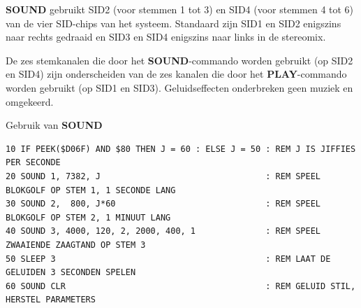 \begin{description}[leftmargin=2cm,style=nextline]
                  {\bf SOUND} gebruikt SID2 (voor stemmen 1 tot 3) en SID4 (voor stemmen 4 tot 6) van de vier SID-chips van het systeem. Standaard zijn SID1 en SID2 enigszins naar rechts gedraaid en SID3 en SID4 enigszins naar links in de stereomix.

                  De zes stemkanalen die door het {\bf SOUND}-commando worden gebruikt (op SID2 en SID4) zijn onderscheiden van de zes kanalen die door het {\bf PLAY}-commando worden gebruikt (op SID1 en SID3). Geluidseffecten onderbreken geen muziek en omgekeerd.

\item [Voorbeeld:]  Gebruik van {\bf SOUND}

\begin{tcolorbox}[colback=black,coltext=white]
\verbatimfont{\codefont}
\begin{verbatim}
10 IF PEEK($D06F) AND $80 THEN J = 60 : ELSE J = 50 : REM J IS JIFFIES PER SECONDE
20 SOUND 1, 7382, J                                 : REM SPEEL BLOKGOLF OP STEM 1, 1 SECONDE LANG
30 SOUND 2,  800, J*60                              : REM SPEEL BLOKGOLF OP STEM 2, 1 MINUUT LANG
40 SOUND 3, 4000, 120, 2, 2000, 400, 1              : REM SPEEL ZWAAIENDE ZAAGTAND OP STEM 3
50 SLEEP 3                                          : REM LAAT DE GELUIDEN 3 SECONDEN SPELEN
60 SOUND CLR                                        : REM GELUID STIL, HERSTEL PARAMETERS
\end{verbatim}
\end{tcolorbox}
\end{description}


\newpage
